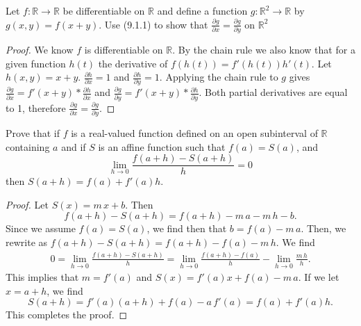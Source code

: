\documentclass[12pt]{book}
\newcommand{\R}{\mathbb{R}}
\newenvironment{exercise}[2][Exercise]{\begin{trivlist}
\item[\hskip \labelsep {\bfseries #1}\hskip \labelsep {\bfseries #2.}]}{\end{trivlist}}
\begin{document}
\begin{exercise}{9.2.6}
 Let $f: \R \to \R$ be differentiable on $\R$ and define a function $g:\R^2 \to \R$ by $g(x,y)=f(x+y)$. Use (9.1.1) to show that $\frac{\partial g}{\partial x} = \frac{\partial g}{\partial y}$ on $\R^2$
\begin{proof} We know $f$ is differentiable on $\R$. By the chain rule we also know that for a given function $h(t)$ the derivative of $f(h(t)) = f'(h(t))h'(t)$. Let $h(x,y) = x + y$. $\frac{\partial h}{\partial x} = 1$ and $\frac{\partial h}{\partial y} = 1$. Applying the chain rule to $g$ gives $\frac{\partial g}{\partial x} = f'(x+y)*\frac{\partial h}{\partial x}$ and $\frac{\partial g}{\partial y} = f'(x+y)*\frac{\partial h}{\partial y}$. Both partial derivatives are equal to 1, therefore $\frac{\partial g}{\partial x} = \frac{\partial g}{\partial y}$.

\end{proof}
\end{exercise}


\begin{exercise}{9.2.7}
	Prove that if $f$ is a real-valued function defined on an open subinterval of $\R$ containing $a$ and if $S$ is an affine function such that $f(a) = S(a)$, and 
		\[ \lim_{h \to 0} \frac{f(a+h) - S(a+h)}{h} = 0 \]
	then $S(a+h) = f(a) + f'(a) h$.
	
	\begin{proof}
	Let $S(x)= m\,x + b $. Then 
	    \[ f(a+h)  - S(a+h) = f(a+h) - m\,a - m\,h - b. \]
	Since we assume $f(a)=S(a)$, we find then that $ b = f(a) - m \,a $. Then, we rewrite as $f(a+h) - S(a+h) = f(a+h) - f(a) - m\,h $. We find
	  \begin{align*}
	    0 = \lim_{h \to 0} \frac{f(a+h)-S(a+h)}{h} = \lim_{h \to 0} \frac{f(a+h) - f(a)}{h} - \lim_{h \to 0} \frac{m\,h}{h}. 
	  \end{align*}
	This implies that $m = f'(a)$ and $S(x) = f'(a) x + f(a) - m\,a$. If we let $x= a+h$, we find 
	    \[ S(a+h) = f'(a) (a+h) + f(a) - a\, f'(a) = f(a) + f'(a)h. \]
	This completes the proof.
	\end{proof}
\end{exercise}
\end{document}

